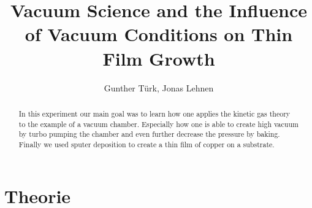 \documentclass[]{article}
\title{Vacuum Science and the Inﬂuence of Vacuum Conditions on Thin Film Growth}
\author{Gunther T\"urk, Jonas Lehnen}
\begin{document}
\maketitle
\tableofcontents
\begin{abstract}
In this experiment our main goal was to learn how one applies the kinetic gas theory to the example of a vacuum chamber. Especially how one is able to create high vacuum by turbo pumping the chamber and even further decrease the pressure by baking. Finally we used sputer deposition to create a thin film of copper on a substrate.

\end{abstract}

\section{Theorie}
\end{document}
